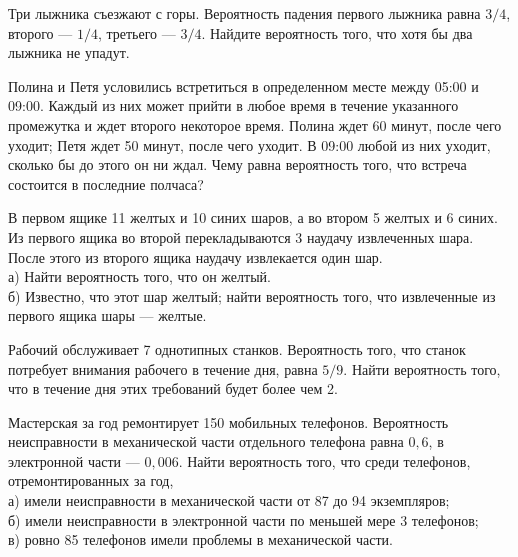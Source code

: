 \newpage\setcounter{zad}{0}



\begin{zkrW}{20}\noindent 
	Три лыжника съезжают с горы. Вероятность падения первого лыжника равна $3/4$, второго --- $1/4$, третьего --- $3/4$. Найдите вероятность того, что хотя бы два лыжника не упадут.
 
\end{zkrW}

\begin{zkrW}{20}\noindent 
	Полина и Петя условились встретиться в определенном месте между 05:00 и 09:00. Каждый из них может прийти в любое время в течение указанного промежутка и ждет второго некоторое время. Полина ждет 60 минут, после чего уходит; Петя ждет 50 минут, после чего уходит. В 09:00 любой из них уходит, сколько бы до этого он ни ждал. Чему равна вероятность того, что встреча состоится в последние полчаса?
 
\end{zkrW}

\begin{zkrW}{20}\noindent 
	В первом ящике 11 желтых и 10 синих шаров, а во втором 5 желтых и 6 синих. Из первого ящика во второй перекладываются 3 наудачу извлеченных шара. После этого из второго ящика наудачу извлекается один шар. \\ \indent а) Найти вероятность того, что он желтый. \\ \indent б) Известно, что этот шар желтый; найти вероятность того, что извлеченные из первого ящика шары --- желтые.
 
\end{zkrW}

\begin{zkrW}{20}\noindent 
	Рабочий обслуживает 7 однотипных станков. Вероятность того, что станок потребует внимания рабочего в течение дня, равна $5/9$. Найти вероятность того, что в течение дня этих требований будет более чем 2.
 
\end{zkrW}

\begin{zkrW}{20}\noindent 
	Мастерская за год ремонтирует 150 мобильных телефонов. Вероятность неисправности в механической части отдельного телефона равна $0{,}6$, в электронной части --- $0{,}006$. Найти вероятность того, что среди телефонов, отремонтированных за год, \\ \indent а) имели неисправности в механической части от 87 до 94 экземпляров; \\ \indent б) имели неисправности в электронной части по меньшей мере 3 телефонов; \\ \indent в) ровно 85 телефонов имели проблемы в механической части.
 
\end{zkrW}

